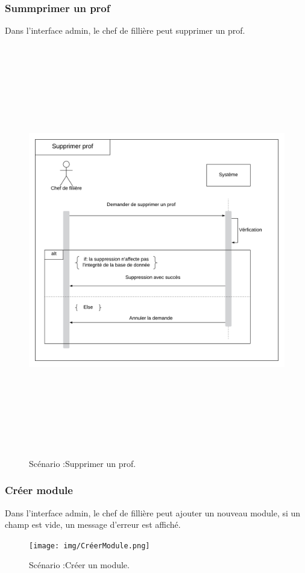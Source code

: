 \subsubsection*{Summprimer un  prof}
Dans l'interface admin, le chef de fillière peut supprimer un prof.
 \begin{figure}[!htb]
      \centering
        \includegraphics[width=15cm,height=18cm]{img/SupprimerProf.png}
        \caption{Scénario :Supprimer un prof. }
    \end{figure}
\newpage
\subsubsection*{Créer module}
Dans l'interface admin, le chef de fillière peut ajouter un nouveau module, si un champ est vide, un message d'erreur est affiché.
 \begin{figure}[!htb]
      \centering
        \texttt{[image: img/CréerModule.png]}
        \caption{Scénario :Créer un module. }
    \end{figure}
\newpage
